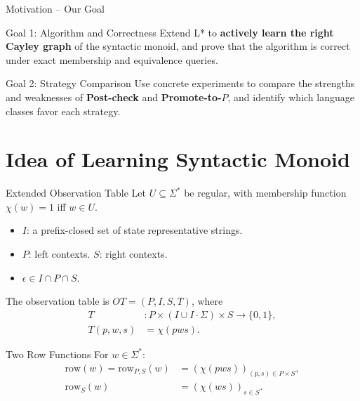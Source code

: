 \documentclass{beamer}
\begin{document}
\begin{frame}{Motivation -- Our Goal}
    \begin{block}{Goal 1: Algorithm and Correctness}
        Extend L* to \textbf{actively learn the right Cayley graph} of the
        syntactic monoid, and prove that the algorithm is correct under
        exact membership and equivalence queries.
    \end{block}

    \begin{block}{Goal 2: Strategy Comparison}
        Use concrete experiments to compare the strengths and weaknesses of
        \textbf{Post-check} and \textbf{Promote-to-$P$}, and identify which
        language classes favor each strategy.
    \end{block}
\end{frame}
\section{Idea of Learning Syntactic Monoid}

\begin{frame}{Extended Observation Table}
    Let $U\subseteq\Sigma^*$ be regular, with membership function
    $\chi(w)=1$ iff $w\in U$.
    \begin{itemize}
        \item $I$: a prefix-closed set of state representative strings.
        \item $P$: left contexts. \qquad $S$: right contexts.
        \item $\epsilon\in I\cap P\cap S$.
    \end{itemize}
    The observation table is $OT=(P,I,S,T)$, where
    $$
    \begin{aligned}
        T&:P\times(I\cup I\cdot\Sigma)\times S\to\{0,1\},\\
        T(p,w,s)&=\chi(pws).
    \end{aligned}
    $$
    \begin{block}{Two Row Functions}
        For $w\in\Sigma^*$:
        $$
        \begin{aligned}
            \text{row}(w)=\text{row}_{P,S}(w)&=(\chi(pws))_{(p,s)\in P\times S},\\
            \text{row}_S(w)&=(\chi(ws))_{s\in S}.
        \end{aligned}
        $$
    \end{block}
\end{frame}
\end{document}
